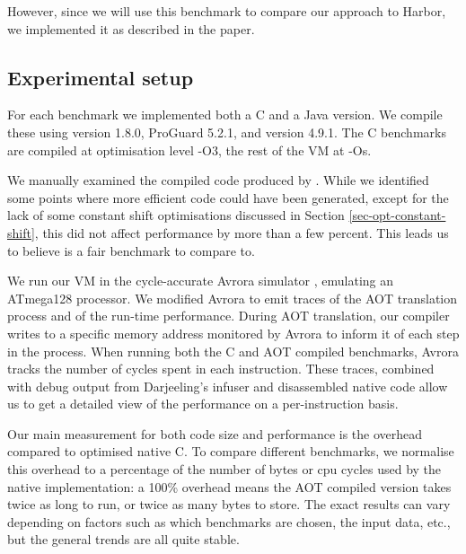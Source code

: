 However, since we will use this benchmark to compare our approach to Harbor, we implemented it as described in the paper.

\subsection{Experimental setup}
For each benchmark we implemented both a C and a Java version. We compile these using  version 1.8.0, ProGuard 5.2.1, and  version 4.9.1. The C benchmarks are compiled at optimisation level -O3, the rest of the VM at -Os.

We manually examined the compiled code produced by . While we identified some points where more efficient code could have been generated, except for the lack of some constant shift optimisations discussed in Section \ref{sec-opt-constant-shift}, this did not affect performance by more than a few percent. This leads us to believe  is a fair benchmark to compare to.

We run our VM in the cycle-accurate Avrora simulator \cite{Titzer:2005vb}, emulating an ATmega128 processor. We modified Avrora to emit traces of the AOT translation process and of the run-time performance. During AOT translation, our compiler writes to a specific memory address monitored by Avrora to inform it of each step in the process. When running both the C and AOT compiled benchmarks, Avrora tracks the number of cycles spent in each instruction. These traces, combined with debug output from Darjeeling's infuser and disassembled native code allow us to get a detailed view of the performance on a per-instruction basis.

Our main measurement for both code size and performance is the overhead compared to optimised native C. To compare different benchmarks, we normalise this overhead to a percentage of the number of bytes or cpu cycles used by the native implementation: a 100\% overhead means the AOT compiled version takes twice as long to run, or twice as many bytes to store. The exact results can vary depending on factors such as which benchmarks are chosen, the input data, etc., but the general trends are all quite stable.
